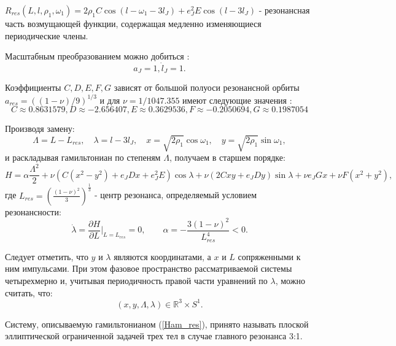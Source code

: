 $R_{res}(L,l,\rho_1,\omega_1) = 2 \rho_1 C \cos(l-\omega_1-3 l_J)+e_J^2E \cos(l - 3 l_J)$ - резонансная часть возмущающей функции, содержащая медленно изменяющиеся периодические члены.

Масштабным преобразованием можно добиться  \cite{wis2}:
$$a_J=1, \dot l_J= 1 .$$

Коэффициенты $C,D,E,F,G$ зависят от большой полуоси резонансной орбиты $a_{res} = ((1-\nu)/9)^{1/3}$ и для $\nu = 1/1047.355$ имеют следующие значения \cite{wis1}:
$$C \approx 0.8631579, D \approx -2.656407, E \approx 0.3629536, F \approx -0.2050694, G \approx 0.1987054$$

Производя замену:
$$\Lambda = L - L_{res}, \quad \lambda = l - 3 l_J, \quad x = \sqrt{2 \rho_1} \cos \omega_1, \quad y = \sqrt{2 \rho_1} \sin \omega_1,$$
и раскладывая гамильтониан по степеням $\Lambda$, получаем в старшем порядке:
\begin{equation}
\label{Ham_res}
H = \alpha \frac{\Lambda^2}{2} + \nu \left( C(x^2-y^2)+e_J D x + e_J^2 E \right) \cos \lambda + \nu (2Cxy+e_J D y) \sin \lambda + \nu e_J G x + \nu F(x^2+y^2),
\end{equation}
где $L_{res} = \left( \frac{(1-\nu)^2}{3} \right)^\frac13$ - центр резонанса, определяемый условием резонансности:
$$
\dot \lambda = \frac{\partial H}{\partial L}|_{L=L_{res}}=0, \qquad\alpha = -\frac{3(1-\nu)^2}{L_{res}^4} < 0.$$

Следует отметить, что $y$ и $\lambda$ являются координатами, а $x$ и $L$ сопряженными к ним импульсами. При этом фазовое пространство рассматриваемой системы  четырехмерно и, учитывая периодичность правой части уравнений по $\lambda$, можно считать, что:
$$(x,y,\Lambda,\lambda) \in \mathbb{R}^3 \times S^1 .$$

Систему, описываемую гамильтонианом (\ref{Ham_res}), принято называть плоской эллиптической ограниченной задачей трех тел в случае главного резонанса 3:1.